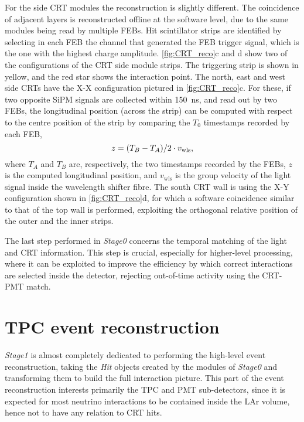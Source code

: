 For the side CRT modules the reconstruction is slightly different. The coincidence of adjacent layers is reconstructed offline at the software level, due to the same modules being read by multiple FEBs. Hit scintillator strips are identified by selecting in each FEB the channel that generated the FEB trigger signal, which is the one with the highest charge amplitude. \autoref{fig:CRT_reco}c and d show two of the configurations of the CRT side module strips. The triggering strip is shown in yellow, and the red star shows the interaction point. The north, east and west side CRTs have the X-X configuration pictured in \autoref{fig:CRT_reco}c. For these, if two opposite SiPM signals are collected within \SI{150}{\ns}, and read out by two FEBs, the longitudinal position (across the strip) can be computed with respect to the centre position of the strip by comparing the $T_0$ timestamps recorded by each FEB, \begin{equation}
    z = \qty(T_B - T_A)/2 \cdot v_\mathrm{wls}, 
\end{equation} where $T_A$ and $T_B$ are, respectively, the two timestamps recorded by the FEBs, $z$ is the computed longitudinal position, and $v_\mathrm{wls}$ is the group velocity of the light signal inside the wavelength shifter fibre. The south CRT wall is using the X-Y configuration shown in \autoref{fig:CRT_reco}d, for which a software coincidence similar to that of the top wall is performed, exploiting the orthogonal relative position of the outer and the inner strips. 

The last step performed in \emph{Stage0} concerns the temporal matching of the light and CRT information. This step is crucial, especially for higher-level processing, where it can be exploited to improve the efficiency by which correct interactions are selected inside the detector, rejecting out-of-time activity using the CRT-PMT match. 

\section{TPC event reconstruction}

\emph{Stage1} is almost completely dedicated to performing the high-level event reconstruction, taking the \emph{Hit} objects created by the modules of \emph{Stage0} and transforming them to build the full interaction picture. This part of the event reconstruction interests primarily the TPC and PMT sub-detectors, since it is expected for most neutrino interactions to be contained inside the LAr volume, hence not to have any relation to CRT hits. 

